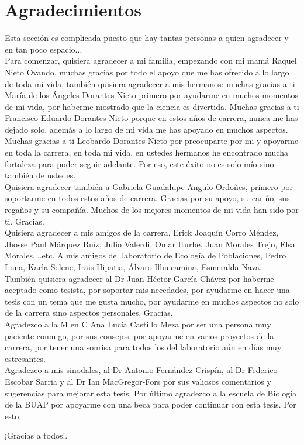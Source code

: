 \documentclass[letterpaper,12pt]{article}
\begin{document}
\section*{Agradecimientos}
Esta sección es complicada puesto que hay tantas personas a quien agradecer y en tan poco espacio...\\
Para comenzar, quisiera agradecer a mi familia, empezando con mi mamá Raquel Nieto Ovando, muchas gracias por todo el apoyo que me has ofrecido a lo largo de toda mi vida, también quisiera agradecer a mis hermanos: muchas gracias a ti María de los Ángeles Dorantes Nieto primero por ayudarme en muchos momentos de mi vida, por haberme mostrado que la ciencia es divertida. Muchas gracias a ti Francisco Eduardo Dorantes Nieto porque en estos años de carrera, nunca me has dejado solo, además a lo largo de mi vida me has apoyado en muchos aspectos. Muchas gracias a ti Leobardo Dorantes Nieto por preocuparte por mi y apoyarme en toda la carrera, en toda mi vida, en ustedes hermanos he encontrado mucha fortaleza para poder seguir adelante. Por eso, este éxito no es solo mío sino también de ustedes.\\
Quisiera agradecer también a Gabriela Guadalupe Angulo Ordoñes, primero por soportarme en todos estos años de carrera. Gracias por su apoyo, su cariño, sus regaños y su compañía. Muchos de los mejores momentos de mi vida han sido por ti. Gracias.\\
Quisiera agradecer a mis amigos de la carrera, Erick Joaquín Corro Méndez, Jhosse Paul Márquez Ruíz, Julio Valerdi, Omar Iturbe, Juan Morales Trejo, Elsa Morales....etc. A mis amigos del laboratorio de Ecología de Poblaciones, Pedro Luna, Karla Selene, Irais Hipatia, Álvaro Ilhuicamina, Esmeralda Nava. \\
También quisiera agradecer al Dr Juan Héctor García Chávez por haberme aceptado como tesista, por soportar mis necedades, por ayudarme en hacer una tesis con un tema que me gusta mucho, por ayudarme en muchos aspectos no solo de la carrera sino aspectos personales. Gracias.\\
Agradezco a la M en C Ana Lucía Castillo Meza por ser una persona muy paciente conmigo, por sus consejos, por apoyarme en varios proyectos de la carrera, por tener una sonrisa para todos los del laboratorio aún en días muy estresantes.\\
Agradezco a mis sinodales, al Dr Antonio Fernández Crispín, al Dr Federico Escobar Sarria y al Dr Ian MacGregor-Fors por sus valiosos comentarios y sugerencias  para mejorar esta tesis.
Por último agradezco a la escuela de Biología de la BUAP por apoyarme con una beca para poder continuar con esta tesis.
Por esto. \\
\begin{center}
¡Gracias a todos!.  
\end{center}
\end{document}
